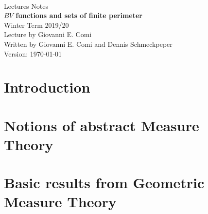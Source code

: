 \documentclass[ngerman]{report}
\begin{document}
\begin{titlepage}
  \centering\text{}\\[14ex]
  \Huge Lectures Notes\\[2ex]
  \Huge {\bf $BV$ functions and sets of finite perimeter}\\[18ex]
  \LARGE Winter Term 2019/20\\[22ex]
  Lecture by Giovanni E. Comi\\[2ex]
  Written by Giovanni E. Comi and Dennis Schmeckpeper\\[8ex]
  \Large Version: \today\\
\end{titlepage}
\tableofcontents
\chapter*{Introduction}

\chapter{Notions of abstract Measure Theory}

\chapter{Basic results from Geometric Measure Theory}

%

\cleardoublepage 


\end{document}
